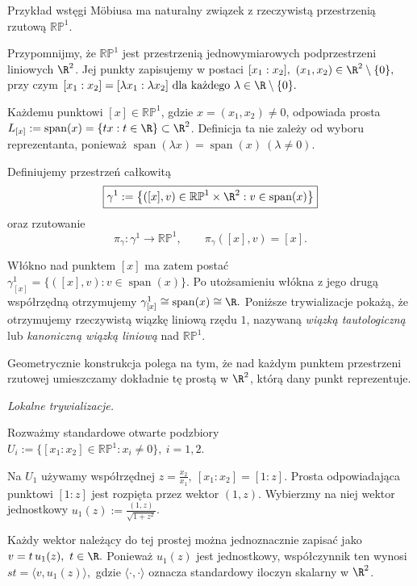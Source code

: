 \begin{przyklad}
\label{prz:tautologiczna-rp1}

Przykład wstęgi Möbiusa ma naturalny związek z rzeczywistą
przestrzenią rzutową $\mathbb{RP}^1$.

Przypomnijmy, że $\mathbb{RP}^1$ jest przestrzenią
jednowymiarowych podprzestrzeni liniowych $\R^2$.
Jej punkty zapisujemy w postaci
$
[x_1:x_2],
\ (x_1,x_2)\in\R^2\setminus\{0\},
$
przy czym
$
[x_1:x_2]=[\lambda x_1:\lambda x_2]
\ \text{dla każdego }\lambda\in\R\setminus\{0\}.
$


Każdemu punktowi $[x]\in\mathbb{RP}^1$,
gdzie $x=(x_1,x_2)\neq0$, odpowiada prosta $L_{[x]}:=\operatorname{span}(x) =\{tx:t\in\R\}\subset\R^2$.
Definicja ta nie zależy od wyboru reprezentanta,
ponieważ
$
\operatorname{span}(\lambda x)
=\operatorname{span}(x)
\ (\lambda\neq0).
$

Definiujemy przestrzeń całkowitą
\[
\boxed{
\gamma^1
:=
\bigl\{
([x],v)\in\mathbb{RP}^1\times\R^2:
v\in\operatorname{span}(x)
\bigr\}
}
\]
oraz rzutowanie
\[
\pi_\gamma\colon\gamma^1\longrightarrow\mathbb{RP}^1,
\qquad
\pi_\gamma([x],v)=[x].
\]

Włókno nad punktem $[x]$ ma zatem postać
$
\gamma^1_{[x]}
=
\bigl\{
([x],v):v\in\operatorname{span}(x)
\bigr\}.
$
Po utożsamieniu włókna z jego drugą współrzędną
otrzymujemy
$
\gamma^1_{[x]}\cong\operatorname{span}(x)\cong\R.
$
Poniższe trywializacje pokażą, że otrzymujemy
rzeczywistą wiązkę liniową rzędu $1$,
nazywaną \emph{wiązką tautologiczną}
lub \emph{kanoniczną wiązką liniową} nad $\mathbb{RP}^1$.

Geometrycznie konstrukcja polega na tym, że nad
każdym punktem przestrzeni rzutowej umieszczamy
dokładnie tę prostą w $\R^2$, którą dany punkt
reprezentuje.

\medskip
\emph{Lokalne trywializacje.}

Rozważmy standardowe otwarte podzbiory
$
U_i:=\{[x_1:x_2]\in\mathbb{RP}^1:x_i\neq0\},\ i=1,2.
$


Na $U_1$ używamy współrzędnej $z=\frac{x_2}{x_1}, \ [x_1:x_2]=[1:z]$.
Prosta odpowiadająca punktowi $[1:z]$
jest rozpięta przez wektor $(1,z)$.
Wybierzmy na niej wektor jednostkowy $u_1(z):=\frac{(1,z)}{\sqrt{1+z^2}}$.

Każdy wektor należący do tej prostej
można jednoznacznie zapisać jako
$
v=t\,u_1(z),
\ t\in\R.
$
Ponieważ $u_1(z)$ jest jednostkowy,
współczynnik ten wynosi
$s
t=\langle v,u_1(z)\rangle,
$
gdzie $\langle\cdot,\cdot\rangle$
oznacza standardowy iloczyn skalarny w $\R^2$.


\end{przyklad}
